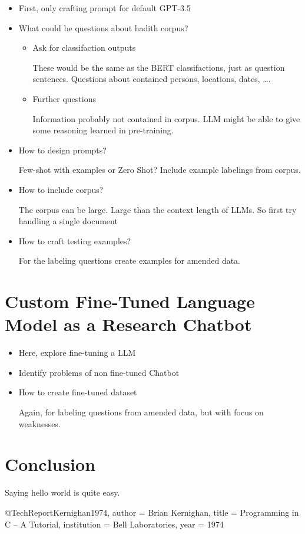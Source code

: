 \documentclass[english, version-2022-01]{uzl-thesis}
\begin{document}
\begin{itemize}
	\item First, only crafting prompt for default GPT-3.5
	\item What could be questions about hadith corpus?
	      \begin{itemize}
		      \item Ask for classifaction outputs

		            These would be the same as the BERT classifactions, just as question sentences. Questions about contained persons, locations, dates, \dots.
		      \item Further questions

		            Information probably not contained in corpus. LLM might be able to give some reasoning learned in pre-training.
	      \end{itemize}
	\item How to design prompts?

	      Few-shot with examples or Zero Shot? Include example labelings from corpus.
	\item How to include corpus?

	      The corpus can be large. Large than the context length of LLMs. So first try handling a single document
	\item How to craft testing examples?

	      For the labeling questions create examples for amended data.
\end{itemize}
\chapter{Custom Fine-Tuned Language Model as a Research Chatbot}
\begin{itemize}
	\item Here, explore fine-tuning a LLM
	\item Identify problems of non fine-tuned Chatbot
	\item How to create fine-tuned dataset

	      Again, for labeling questions from amended data, but with focus on weaknesses.
\end{itemize}
\chapter{Conclusion}
Saying hello world is quite easy.
\begin{bibtex-entries}
@TechReport{Kernighan1974,
	author = {Brian Kernighan},
	title = {Programming in C – A Tutorial},
	institution = {Bell Laboratories},
	year = {1974}
}
\end{bibtex-entries}
\end{document}
